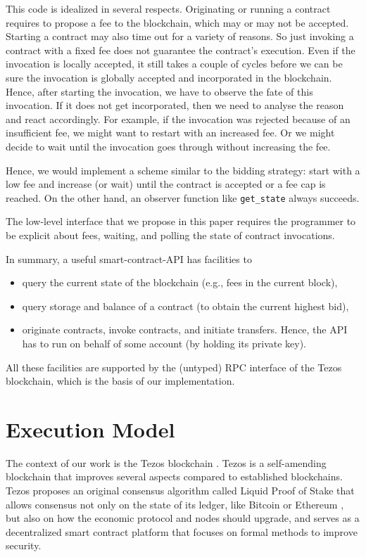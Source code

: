 \documentclass[a4paper]{llncs}
\begin{document}
This code is idealized in several respects. Originating or running a contract
requires to propose a fee to the blockchain, which may or may not be
accepted.
Starting a contract may also time out for a variety of reasons. So just
invoking a contract with a fixed fee does not guarantee the contract's
execution.  Even if the invocation is locally accepted, it still takes
a couple of cycles before we can be sure the invocation is globally
accepted and incorporated in the blockchain.
Hence, after starting the invocation, we have to observe the fate of
this invocation. If it does not get incorporated, then we need to
analyse the reason and react accordingly. For example, if the
invocation was rejected because of an insufficient fee, we might want
to restart with an increased fee. Or we might decide to wait until the
invocation goes through without increasing the fee.

Hence, we would implement a scheme similar to
the bidding strategy: start with a low fee and increase (or wait) until the
contract is accepted or a fee cap is reached. On the other hand, an
observer function like \lstinline/get_state/ always succeeds.

The low-level interface that we propose in this paper requires the
programmer to be explicit about fees, waiting, and polling the state
of contract invocations. 

In summary, a useful smart-contract-API  has facilities to
\begin{itemize}
\item query the current state of the blockchain (e.g., fees in the
  current block),
\item query storage and balance of a contract (to obtain
  the current highest bid),
\item originate contracts, invoke contracts, and initiate
  transfers. Hence, the API has to run on
  behalf of some account (by holding its private key).
\end{itemize}
All these facilities are supported by the (untyped) RPC interface of the Tezos
blockchain, which is the basis of our implementation. 

\section{Execution Model}
\label{sec:execution-model}
The context of our work is the Tezos blockchain \cite{tezos-whitepaper,tezos-intropaper}. Tezos is a self-amending blockchain that improves several aspects compared to established blockchains. Tezos proposes an original consensus algorithm called Liquid Proof of Stake that allows consensus not only on the state of its ledger, like Bitcoin \cite{bitcoin-whitepaper} or Ethereum \cite{eth-whitepaper}, but also on how the economic protocol and nodes should upgrade, and serves as a decentralized smart contract platform that focuses on formal methods to improve security. 
\end{document}
